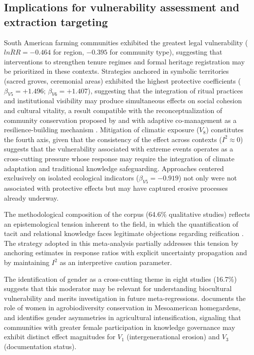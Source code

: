 \documentclass[12pt,a4paper]{article}
\begin{document}
\subsection{Implications for vulnerability assessment and extraction targeting}
\label{sec:vulnerability-implications}

South American farming communities exhibited the greatest legal vulnerability ($\overline{lnRR} = -0.464$ for region, $-0.395$ for community type), suggesting that interventions to strengthen tenure regimes and formal heritage registration may be prioritized in these contexts. Strategies anchored in symbolic territories (sacred groves, ceremonial areas) exhibited the highest protective coefficients ($\beta_{V5} = +1.496$; $\beta_{V6} = +1.407$), suggesting that the integration of ritual practices and institutional visibility may produce simultaneous effects on social cohesion and cultural vitality, a result compatible with the reconceptualization of community conservation proposed by \citet{Berkes2004} and with adaptive co-management as a resilience-building mechanism \citep{OlssonFolkeBerkes2004}. Mitigation of climatic exposure ($V_8$) constitutes the fourth axis, given that the consistency of the effect across contexts ($I^2 \approx 0$) suggests that the vulnerability associated with extreme events operates as a cross-cutting pressure whose response may require the integration of climate adaptation and traditional knowledge safeguarding. Approaches centered exclusively on isolated ecological indicators ($\beta_{V5} = -0.919$) not only were not associated with protective effects but may have captured erosive processes already underway.

The methodological composition of the corpus (64.6\% qualitative studies) reflects an epistemological tension inherent to the field, in which the quantification of tacit and relational knowledge faces legitimate objections regarding reification \citep{Agrawal2002,GomezBaggethun2013}. The strategy adopted in this meta-analysis partially addresses this tension by anchoring estimates in response ratios with explicit uncertainty propagation and by maintaining $I^2$ as an interpretive caution parameter.

The identification of gender as a cross-cutting theme in eight studies (16.7\%) suggests that this moderator may be relevant for understanding biocultural vulnerability and merits investigation in future meta-regressions. \citet{RomeroSilva2026} documents the role of women in agrobiodiversity conservation in Mesoamerican homegardens, and \citet{MugiNgenga2016} identifies gender asymmetries in agricultural intensification, signaling that communities with greater female participation in knowledge governance may exhibit distinct effect magnitudes for $V_1$ (intergenerational erosion) and $V_3$ (documentation status).
\end{document}
